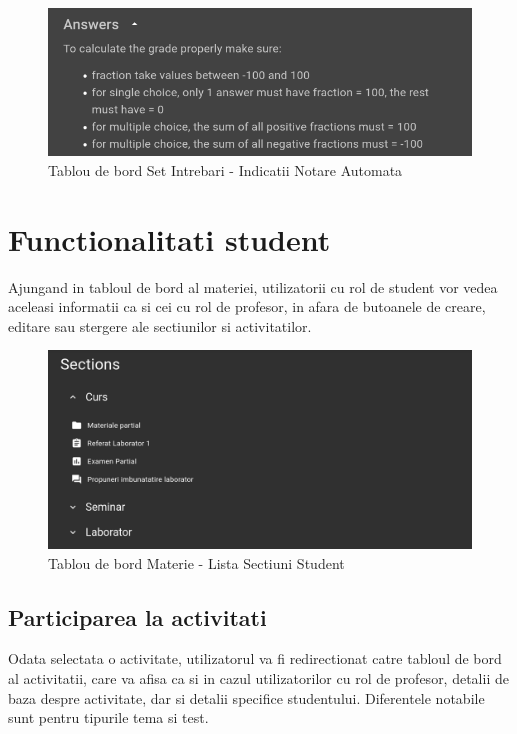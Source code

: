 \documentclass[12pt, a4paper, oneside, romanian]{teza-upb}
\begin{document}
\begin{figure}[H]
\centering
\includegraphics*[width=0.7\columnwidth]{tablou-de-bord-set-intrebari-indicatii-notare-automata}
\caption{Tablou de bord Set Intrebari - Indicatii Notare Automata}
\label{tablou-de-bord-set-intrebari-indicatii-notare-automata}
\end{figure}

\section{Functionalitati student}

Ajungand in tabloul de bord al materiei, utilizatorii cu rol de student vor vedea aceleasi informatii ca si cei cu rol de profesor, in afara de butoanele de creare, editare sau stergere ale sectiunilor si activitatilor.

\begin{figure}[H]
\centering
\includegraphics*[width=0.7\columnwidth]{tablou-de-bord-materie-lista-sectiuni-student}
\caption{Tablou de bord Materie - Lista Sectiuni Student}
\label{tablou-de-bord-materie-lista-sectiuni-student}
\end{figure}

\subsection{Participarea la activitati}

Odata selectata o activitate, utilizatorul va fi redirectionat catre tabloul de bord al activitatii, care va afisa ca si in cazul utilizatorilor cu rol de profesor, detalii de baza despre activitate, dar si detalii specifice studentului. Diferentele notabile sunt pentru tipurile tema si test.
\end{document}
